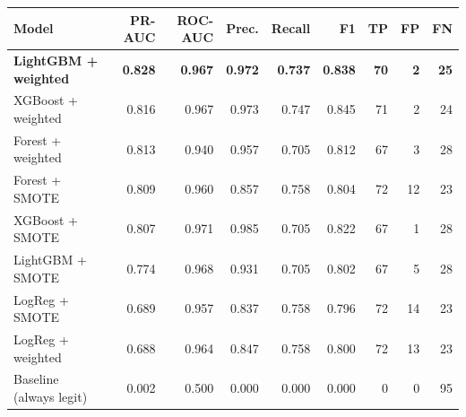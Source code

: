 \begin{tabular}{l r r r r r r r r}
\hline
\textbf{Model} & \textbf{PR-AUC} & \textbf{ROC-AUC} & \textbf{Prec.} & \textbf{Recall} & \textbf{F1} & \textbf{TP} & \textbf{FP} & \textbf{FN} \\
\hline
\textbf{LightGBM + weighted} & \textbf{0.828} & \textbf{0.967} & \textbf{0.972} & \textbf{0.737} & \textbf{0.838} & \textbf{70} & \textbf{2} & \textbf{25} \\
XGBoost + weighted & 0.816 & 0.967 & 0.973 & 0.747 & 0.845 & 71 & 2 & 24 \\
Forest + weighted & 0.813 & 0.940 & 0.957 & 0.705 & 0.812 & 67 & 3 & 28 \\
Forest + SMOTE & 0.809 & 0.960 & 0.857 & 0.758 & 0.804 & 72 & 12 & 23 \\
XGBoost + SMOTE & 0.807 & 0.971 & 0.985 & 0.705 & 0.822 & 67 & 1 & 28 \\
LightGBM + SMOTE & 0.774 & 0.968 & 0.931 & 0.705 & 0.802 & 67 & 5 & 28 \\
LogReg + SMOTE & 0.689 & 0.957 & 0.837 & 0.758 & 0.796 & 72 & 14 & 23 \\
LogReg + weighted & 0.688 & 0.964 & 0.847 & 0.758 & 0.800 & 72 & 13 & 23 \\
Baseline (always legit) & 0.002 & 0.500 & 0.000 & 0.000 & 0.000 & 0 & 0 & 95 \\
\hline
\end{tabular}